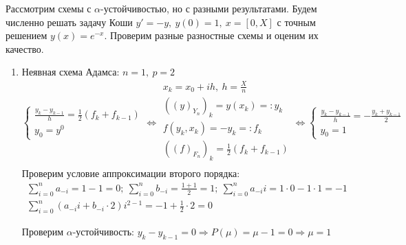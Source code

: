 \begin{example}
  Рассмотрим схемы с $\alpha$-устойчивостью, но с разными
  результатами. Будем численно решать задачу
  Коши $y'=-y,\ y(0)=1,\ x=[0,X]$ с точным решением $y(x)=e^{-x}$.
  Проверим разные разностные схемы и оценим их качество.
  \begin{enumerate}
    \item Неявная схема Адамса: $n=1,\ p=2$
          \[
            \begin{cases}
              \frac{y_{k}-y_{k-1}}{h}=\frac{1}{2}\left({f_{k}+f_{k-1}}\right) \\
              y_0=y^0
            \end{cases} \Leftrightarrow
            \begin{array}{c}
              x_k=x_0+ih,\ h=\frac{X}{n}                            \\
              ((y)_{Y_n})_k=y(x_k)=:y_k                             \\
              f(y_{k},x_k)=-y_k=:f_{k}                              \\
              ((f)_{F_n})_k=\frac{1}{2}\left({f_{k}+f_{k-1}}\right) \\
            \end{array}\Leftrightarrow
            \begin{cases}
              \frac{y_k-y_{k-1}}{h}=-\frac{y_k+y_{k-1}}{2} \\
              y_0=1
            \end{cases}
          \]
          Проверим условие аппроксимации второго порядка:
          \[\begin{array}{c}
              \sum\limits_{i=0}^na_{-i}=1-1=0;\ \sum\limits_{i=0}^nb_{-i}=\frac{1+1}{2}=1;\ \sum\limits_{i=0}^na_{-i}i=1\cdot0 - 1\cdot1=-1 \\
              \sum\limits_{i=0}^n(a_{-i}i+b_{-i}\cdot2)i^{2-1}=-1 + \frac{1}{2}\cdot2=0
            \end{array}\]

          Проверим $\alpha$-устойчивость: $y_k-y_{k-1}=0\Rightarrow P(\mu)=\mu-1=0\Rightarrow\mu=1$


\end{enumerate}
\end{example}
